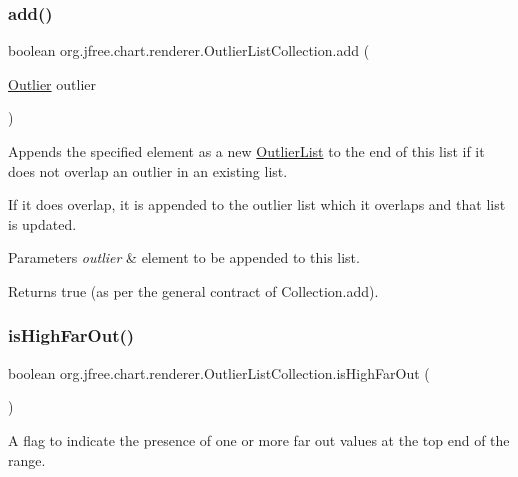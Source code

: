 \subsubsection{\texorpdfstring{add()}{add()}}
{\footnotesize\ttfamily boolean org.\+jfree.\+chart.\+renderer.\+Outlier\+List\+Collection.\+add (\begin{DoxyParamCaption}\item[{\mbox{\hyperlink{classorg_1_1jfree_1_1chart_1_1renderer_1_1_outlier}{Outlier}}}]{outlier }\end{DoxyParamCaption})}

Appends the specified element as a new {\ttfamily \mbox{\hyperlink{classorg_1_1jfree_1_1chart_1_1renderer_1_1_outlier_list}{Outlier\+List}}} to the end of this list if it does not overlap an outlier in an existing list.

If it does overlap, it is appended to the outlier list which it overlaps and that list is updated.


\begin{DoxyParams}{Parameters}
{\em outlier} & element to be appended to this list.\\
\hline
\end{DoxyParams}
\begin{DoxyReturn}{Returns}
{\ttfamily true} (as per the general contract of Collection.\+add). 
\end{DoxyReturn}
\mbox{\label{classorg_1_1jfree_1_1chart_1_1renderer_1_1_outlier_list_collection_afbde934fba8104920eb66abae9ac7328}} 
\subsubsection{\texorpdfstring{is\+High\+Far\+Out()}{isHighFarOut()}}
{\footnotesize\ttfamily boolean org.\+jfree.\+chart.\+renderer.\+Outlier\+List\+Collection.\+is\+High\+Far\+Out (\begin{DoxyParamCaption}{ }\end{DoxyParamCaption})}

A flag to indicate the presence of one or more far out values at the top end of the range.


